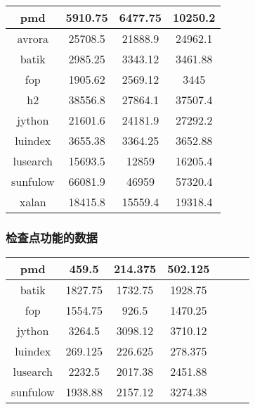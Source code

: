 \begin{table}[htbp]
	\centering
	\begin{tabular}{c|c|c|c}
		\hline
		pmd & 5910.75 & 6477.75 & 10250.2 \\
		\hline
		avrora & 25708.5 & 21888.9 & 24962.1 \\
		\hline
		batik & 2985.25 & 3343.12 & 3461.88 \\
		\hline
		fop & 1905.62 & 2569.12 & 3445 \\
		\hline
		h2 & 38556.8 & 27864.1 & 37507.4 \\
		\hline
		jython & 21601.6 & 24181.9 & 27292.2 \\
		\hline
		luindex & 3655.38 & 3364.25 & 3652.88 \\
		\hline
		lusearch & 15693.5 & 12859 & 16205.4 \\
		\hline
		sunfulow & 66081.9 & 46959 & 57320.4 \\
		\hline
		xalan & 18415.8 & 15559.4 & 19318.4 \\
		\hline
	\end{tabular}
\end{table}

\subsubsection{检查点功能的数据}

\begin{table}[htbp]
	\centering
	\begin{tabular}{c|c|c|c|c|c|c}
		\hline
		pmd & 459.5 & 214.375 & 502.125 \\
		\hline
		batik & 1827.75 & 1732.75 & 1928.75 \\
		\hline
		fop & 1554.75 & 926.5 & 1470.25 \\
		\hline
		jython & 3264.5 & 3098.12 & 3710.12 \\
		\hline
		luindex & 269.125 & 226.625 & 278.375 \\
		\hline
		lusearch & 2232.5 & 2017.38 & 2451.88 \\
		\hline
		sunfulow & 1938.88 & 2157.12 & 3274.38 \\
		\hline
	\end{tabular}
\end{table}
